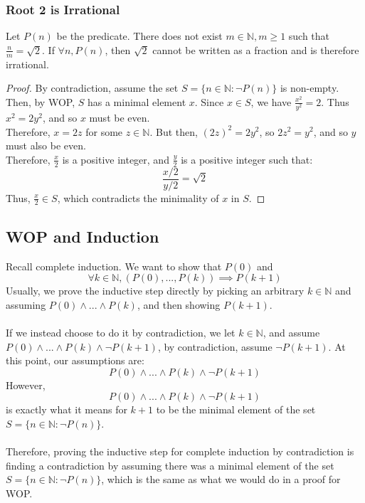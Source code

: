 \documentclass{article}
\begin{document}
\subsubsection{Root 2 is Irrational}
Let $P(n)$ be the predicate. There does not exist $m \in \mathbb{N}, m \geq 1$ such that $\frac{n}{m} = \sqrt{2}$. If $\forall n, P(n)$, then $\sqrt{2}$ cannot be written as a fraction and is therefore irrational.
\begin{proof}
By contradiction, assume the set $S = \{n \in \mathbb{N} : \neg P(n)\}$ is non-empty. Then, by WOP, $S$ has a minimal element $x$. Since $x \in S$, we have $\frac{x^2}{y^2} = 2$. Thus $x^2 = 2y^2$, and so $x$ must be even.\\
Therefore, $x = 2z$ for some $z \in \mathbb{N}$. But then, $(2z)^2 = 2y^2$, so $2z^2 = y^2$, and so $y$ must also be even.\\
Therefore, $\frac{x}{2}$ is a positive integer, and $\frac{y}{2}$ is a positive integer such that:
$$\frac{x/2}{y/2} = \sqrt{2}$$
Thus, $\frac{x}{2} \in S$, which contradicts the minimality of $x$ in $S$.
\end{proof}

\subsection{WOP and Induction}
Recall complete induction. We want to show that $P(0)$ and
$$\forall k \in \mathbb{N}, (P(0), ..., P(k)) \implies P(k + 1)$$
Usually, we prove the inductive step directly by picking an arbitrary $k \in \mathbb{N}$ and assuming $P(0) \land ... \land P(k)$, and then showing $P(k+1)$.\\
\\
If we instead choose to do it by contradiction, we let $k \in \mathbb{N}$, and assume $P(0) \land ... \land P(k) \land \neg P(k + 1)$, by contradiction, assume $\neg P(k + 1)$. At this point, our assumptions are:
$$P(0) \land ... \land P(k) \land \neg P(k + 1)$$
However,
$$P(0) \land ... \land P(k) \land \neg P(k + 1)$$
is exactly what it means for $k + 1$ to be the minimal element of the set $S = \{n \in \mathbb{N} : \neg P(n)\}$.\\
\\
Therefore, proving the inductive step for complete induction by contradiction is finding a contradiction by assuming there was a minimal element of the set $S = \{ n \in \mathbb{N} : \neg P(n)\}$, which is the same as what we would do in a proof for WOP.
\end{document}
